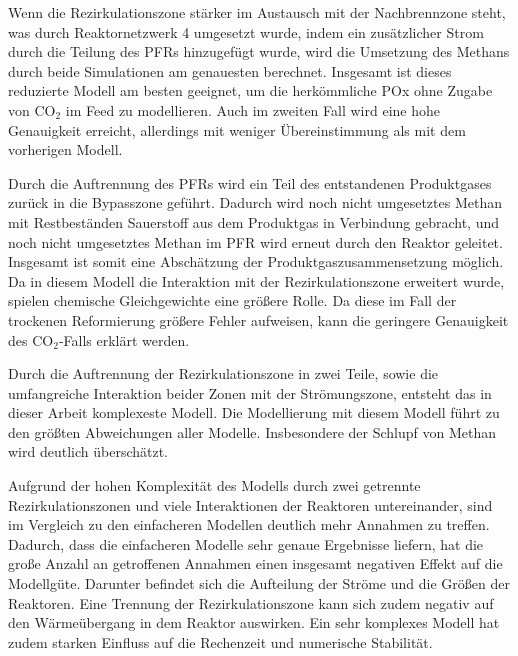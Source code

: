         Wenn die Rezirkulationszone stärker im Austausch mit der Nachbrennzone steht, was durch Reaktornetzwerk 4 umgesetzt wurde, indem ein zusätzlicher Strom durch die Teilung des PFRs hinzugefügt wurde, wird die Umsetzung des Methans durch beide Simulationen am genauesten berechnet. Insgesamt ist dieses reduzierte Modell am besten geeignet, um die herkömmliche POx ohne Zugabe von CO$_2$ im Feed zu modellieren. Auch im zweiten Fall wird eine hohe Genauigkeit erreicht, allerdings mit weniger Übereinstimmung als mit dem vorherigen Modell. 

        Durch die Auftrennung des PFRs wird ein Teil des entstandenen Produktgases zurück in die Bypasszone geführt. Dadurch wird noch nicht umgesetztes Methan mit Restbeständen Sauerstoff aus dem Produktgas in Verbindung gebracht, und noch nicht umgesetztes Methan im PFR wird erneut durch den Reaktor geleitet. Insgesamt ist somit eine Abschätzung der Produktgaszusammensetzung möglich. Da in diesem Modell die Interaktion mit der Rezirkulationszone erweitert wurde, spielen chemische Gleichgewichte eine größere Rolle. Da diese im Fall der trockenen Reformierung größere Fehler aufweisen, kann die geringere Genauigkeit des CO$_2$-Falls erklärt werden. 

        Durch die Auftrennung der Rezirkulationszone in zwei Teile, sowie die umfangreiche Interaktion beider Zonen mit der Strömungszone, entsteht das in dieser Arbeit komplexeste Modell. Die Modellierung mit diesem Modell führt zu den größten Abweichungen aller Modelle. Insbesondere der Schlupf von Methan wird deutlich überschätzt.

        Aufgrund der hohen Komplexität des Modells durch zwei getrennte Rezirkulationszonen und viele Interaktionen der Reaktoren untereinander, sind im Vergleich zu den einfacheren Modellen deutlich mehr Annahmen zu treffen. Dadurch, dass die einfacheren Modelle sehr genaue Ergebnisse liefern, hat die große Anzahl an getroffenen Annahmen einen insgesamt negativen Effekt auf die Modellgüte. Darunter befindet sich die Aufteilung der Ströme und die Größen der Reaktoren. Eine Trennung der Rezirkulationszone kann sich zudem negativ auf den Wärmeübergang in dem Reaktor auswirken. Ein sehr komplexes Modell hat zudem starken Einfluss auf die Rechenzeit und numerische Stabilität. 

